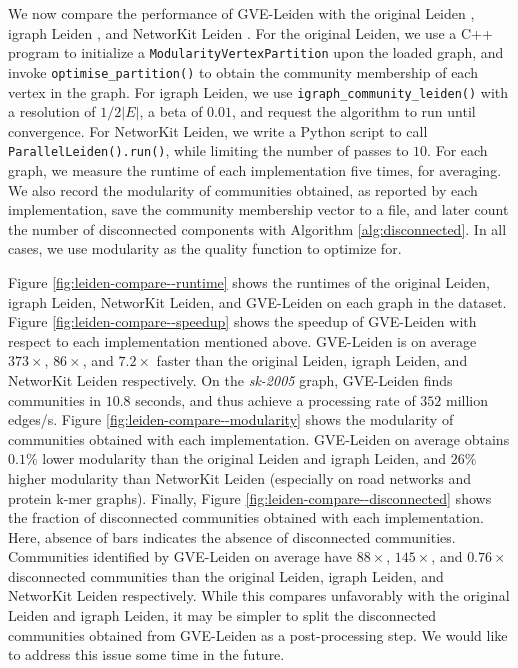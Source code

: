We now compare the performance of GVE-Leiden with the original Leiden \cite{com-traag19}, igraph Leiden \cite{csardi2006igraph}, and NetworKit Leiden \cite{staudt2016networkit}. For the original Leiden, we use a C++ program to initialize a \texttt{ModularityVertexPartition} upon the loaded graph, and invoke \texttt{optimise\_partition()} to obtain the community membership of each vertex in the graph. For igraph Leiden, we use \texttt{igraph\_community\_leiden()} with a resolution of $1/2|E|$, a beta of $0.01$, and request the algorithm to run until convergence. For NetworKit Leiden, we write a Python script to call \texttt{ParallelLeiden().run()}, while limiting the number of passes to $10$. For each graph, we measure the runtime of each implementation five times, for averaging. We also record the modularity of communities obtained, as reported by each implementation, save the community membership vector to a file, and later count the number of disconnected components with Algorithm \ref{alg:disconnected}. In all cases, we use modularity as the quality function to optimize for.

Figure \ref{fig:leiden-compare--runtime} shows the runtimes of the original Leiden, igraph Leiden, NetworKit Leiden, and GVE-Leiden on each graph in the dataset. Figure \ref{fig:leiden-compare--speedup} shows the speedup of GVE-Leiden with respect to each implementation mentioned above. GVE-Leiden is on average $373\times$, $86\times$, and $7.2\times$ faster than the original Leiden, igraph Leiden, and NetworKit Leiden respectively. On the \textit{sk-2005} graph, GVE-Leiden finds communities in $10.8$ seconds, and thus achieve a processing rate of $352$ million edges/s. Figure \ref{fig:leiden-compare--modularity} shows the modularity of communities obtained with each implementation. GVE-Leiden on average obtains $0.1\%$ lower modularity than the original Leiden and igraph Leiden, and $26\%$ higher modularity than NetworKit Leiden (especially on road networks and protein k-mer graphs). Finally, Figure \ref{fig:leiden-compare--disconnected} shows the fraction of disconnected communities obtained with each implementation. Here, absence of bars indicates the absence of disconnected communities. Communities identified by GVE-Leiden on average have $88\times$, $145\times$, and $0.76\times$ disconnected communities than the original Leiden, igraph Leiden, and NetworKit Leiden respectively. While this compares unfavorably with the original Leiden and igraph Leiden, it may be simpler to split the disconnected communities obtained from GVE-Leiden as a post-processing step. We would like to address this issue some time in the future.

